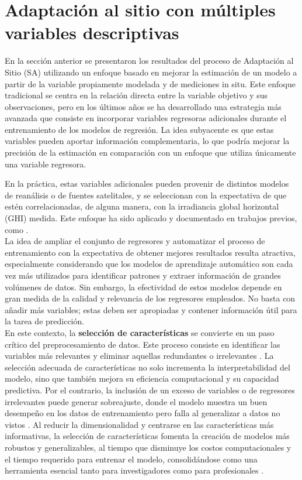  


\section{Adaptación al sitio con múltiples variables descriptivas}\label{sec:02}
En la sección anterior se presentaron los resultados del proceso de Adaptación al Sitio (SA) utilizando un enfoque basado en mejorar la estimación de un modelo a partir de la variable propiamente modelada y de mediciones in situ. Este enfoque tradicional se centra en la relación directa entre la variable objetivo y sus observaciones, pero en los últimos años se ha desarrollado una estrategia más avanzada que consiste en incorporar variables regresoras adicionales durante el entrenamiento de los modelos de regresión. La idea subyacente es que estas variables pueden aportar información complementaria, lo que podría mejorar la precisión de la estimación en comparación con un enfoque que utiliza únicamente una variable regresora. 

En la práctica, estas variables adicionales pueden provenir de distintos modelos de reanálisis o de fuentes satelitales, y se seleccionan con la expectativa de que estén correlacionadas, de alguna manera, con la irradiancia global horizontal (GHI) medida. Este enfoque ha sido aplicado y documentado en trabajos previos, como \cite{Salazar2025, Miranda2021, Miranda2023}.\\

La idea de ampliar el conjunto de regresores y automatizar el proceso de entrenamiento con la expectativa de obtener mejores resultados resulta atractiva, especialmente considerando que los modelos de aprendizaje automático son cada vez más utilizados para identificar patrones y extraer información de grandes volúmenes de datos. Sin embargo, la efectividad de estos modelos depende en gran medida de la calidad y relevancia de los regresores empleados. No basta con añadir más variables; estas deben ser apropiadas y contener información útil para la tarea de predicción.\\

En este contexto, la \textbf{selección de características} se convierte en un paso crítico del preprocesamiento de datos. Este proceso consiste en identificar las variables más relevantes y eliminar aquellas redundantes o irrelevantes \cite{liu2023, Huang2024}. La selección adecuada de características no solo incrementa la interpretabilidad del modelo, sino que también mejora su eficiencia computacional y su capacidad predictiva. Por el contrario, la inclusión de un exceso de variables o de regresores irrelevantes puede generar sobreajuste, donde el modelo muestra un buen desempeño en los datos de entrenamiento pero falla al generalizar a datos no vistos \cite{che2024a}. Al reducir la dimensionalidad y centrarse en las características más informativas, la selección de características fomenta la creación de modelos más robustos y generalizables, al tiempo que disminuye los costos computacionales y el tiempo requerido para entrenar el modelo, consolidándose como una herramienta esencial tanto para investigadores como para profesionales \cite{Cheng2024}.



